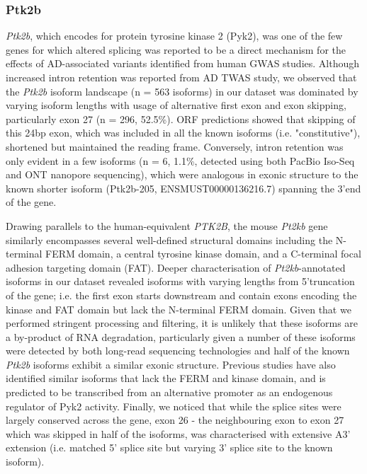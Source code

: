 \subsubsection{Ptk2b}
\textit{Ptk2b}, which encodes for protein tyrosine kinase 2 (Pyk2), was one of the few genes for which altered splicing was reported to be a direct mechanism for the effects of AD-associated variants identified from human GWAS studies\cite{Raj2018}. Although increased intron retention  was reported from AD TWAS study, we observed that the \textit{Ptk2b} isoform landscape (n = 563 isoforms) in our dataset was dominated by varying isoform lengths with usage of alternative first exon and exon skipping, particularly exon 27 (n = 296, 52.5\%). ORF predictions showed that skipping of this 24bp exon, which was included in all the known isoforms (i.e. "constitutive"), shortened but maintained the reading frame. Conversely, intron retention was only evident in a few isoforms (n = 6, 1.1\%, detected using both PacBio Iso-Seq and ONT nanopore sequencing), which were analogous in exonic structure to the known shorter isoform (Ptk2b-205, ENSMUST00000136216.7) spanning the 3'end of the gene. 

Drawing parallels to the human-equivalent \textit{PTK2B}, the mouse \textit{Pt2kb} gene similarly encompasses several well-defined structural domains including the N-terminal FERM domain, a central tyrosine kinase domain, and a C-terminal focal adhesion targeting domain (FAT)\cite{DePins2021}. Deeper characterisation of \textit{Pt2kb}-annotated isoforms in our dataset revealed isoforms with varying lengths from 5'truncation of the gene; i.e. the first exon starts downstream and contain exons encoding the kinase and FAT domain but lack the N-terminal FERM domain. Given that we performed stringent processing and filtering, it is unlikely that these isoforms are a by-product of RNA degradation, particularly given a number of these isoforms were detected by both long-read sequencing technologies and half of the known \textit{Ptk2b} isoforms exhibit a similar exonic structure. Previous studies have also identified similar isoforms that lack the FERM and kinase domain, and is predicted to be transcribed from an alternative promoter as an endogenous regulator of Pyk2 activity\cite{DePins2021}. Finally, we noticed that while the splice sites were largely conserved across the gene, exon 26 - the neighbouring exon to exon 27 which was skipped in half of the isoforms, was characterised with extensive A3' extension (i.e. matched 5' splice site but varying 3' splice site to the known isoform). 

